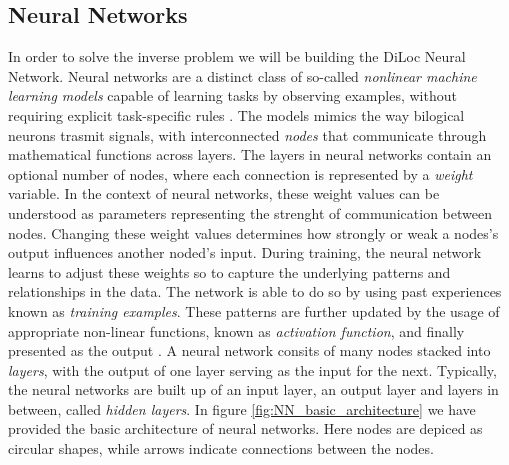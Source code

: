 \documentclass[a4paper, UKenglish, 11pt]{uiomaster}
\begin{document}
\subsection{Neural Networks}
In order to solve the inverse problem we will be building the DiLoc Neural Network. Neural networks are a distinct class of so-called \emph{nonlinear machine learning models} capable of learning tasks by observing examples, without requiring explicit task-specific rules \cite{Hjorth-Jensen2022}. The models mimics the way bilogical neurons trasmit signals, with interconnected \emph{nodes} that communicate through mathematical functions across layers. The layers in neural networks contain an optional number of nodes, where each connection is represented by a \emph{weight} variable. In the context of neural networks, these weight values can be understood as parameters representing the strenght of communication between nodes. Changing these weight values determines how strongly or weak a nodes's output influences another noded's input. During training, the neural network learns to adjust these weights so to capture the underlying patterns and relationships in the data. The network is able to do so by using past experiences known as \emph{training examples}. These patterns are further updated by the usage of appropriate non-linear functions, known as \emph{activation function}, and finally presented as the output \cite{nwankpa2018activation}. A neural network consits of many nodes stacked into \emph{layers}, with the output of one layer serving as the input for the next. Typically, the neural networks are built up of an input layer, an output layer and layers in between, called \emph{hidden layers}. In figure \ref{fig:NN_basic_architecture} we have provided the basic architecture of neural networks. Here nodes are depiced as circular shapes, while arrows indicate connections between the nodes.
\end{document}
